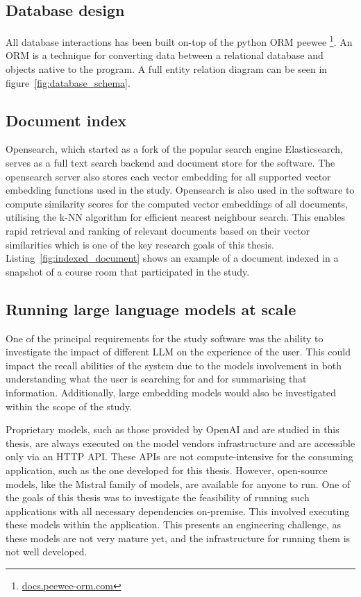 \subsection{Database design}


All database interactions has been built on-top of the python \gls{ORM} peewee \footnote{\href{http://docs.peewee-orm.com/en/latest/}{docs.peewee-orm.com}}. An \gls{ORM} is a technique for converting data between a relational database and objects native to the program. A full entity relation diagram can be seen in figure~\ref{fig:database_schema}.





\subsection{Document index}


Opensearch, which started as a fork of the popular search engine Elasticsearch, serves as a full text search backend and document store for the software. The opensearch server also stores each vector embedding for all supported vector embedding functions used in the study. Opensearch is also used in the software to compute similarity scores for the computed vector embeddings of all documents, utilising the k-NN algorithm for efficient nearest neighbour search. This enables rapid retrieval and ranking of relevant documents based on their vector similarities which is one of the key research goals of this thesis. Listing~\ref{fig:indexed_document} shows an example of a document indexed in a snapshot of a course room that participated in the study.





\subsection{Running large language models at scale}


One of the principal requirements for the study software was the ability to investigate the impact of different \gls{LLM} on the experience of the user. This could impact the recall abilities of the system due to the models involvement in both understanding what the user is searching for and for summarising that information. Additionally, large embedding models would also be investigated within the scope of the study.


Proprietary models, such as those provided by OpenAI and are studied in this thesis, are always executed on the model vendors infrastructure and are accessible only via an HTTP API. These APIs are not compute-intensive for the consuming application, such as the one developed for this thesis. However, open-source models, like the Mistral family of models, are available for anyone to run. One of the goals of this thesis was to investigate the feasibility of running such applications with all necessary dependencies on-premise. This involved executing these models within the application. This presents an engineering challenge, as these models are not very mature yet, and the infrastructure for running them is not well developed.


